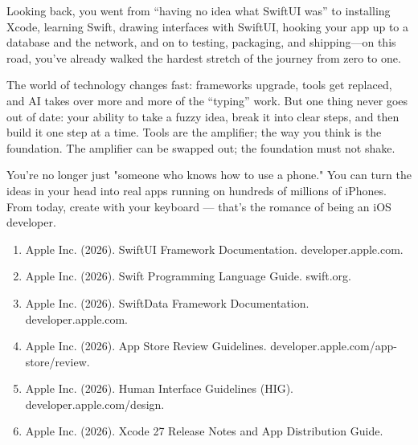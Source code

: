 Looking back, you went from “having no idea what SwiftUI was” to installing Xcode, learning Swift, drawing interfaces with SwiftUI, hooking your app up to a database and the network, and on to testing, packaging, and shipping—on this road, you've already walked the hardest stretch of the journey from zero to one.

The world of technology changes fast: frameworks upgrade, tools get replaced, and AI takes over more and more of the “typing” work. But one thing never goes out of date: your ability to take a fuzzy idea, break it into clear steps, and then build it one step at a time. Tools are the amplifier; the way you think is the foundation. The amplifier can be swapped out; the foundation must not shake.

You're no longer just "someone who knows how to use a phone." You can turn the ideas in your head into real apps running on hundreds of millions of iPhones. From today, create with your keyboard — that's the romance of being an iOS developer.


\begin{enumerate}
  \item Apple Inc. (2026). SwiftUI Framework Documentation. developer.apple.com.
  \item Apple Inc. (2026). Swift Programming Language Guide. swift.org.
  \item Apple Inc. (2026). SwiftData Framework Documentation. developer.apple.com.
  \item Apple Inc. (2026). App Store Review Guidelines. developer.apple.com/app-store/review.
  \item Apple Inc. (2026). Human Interface Guidelines (HIG). developer.apple.com/design.
  \item Apple Inc. (2026). Xcode 27 Release Notes and App Distribution Guide.
\end{enumerate}
